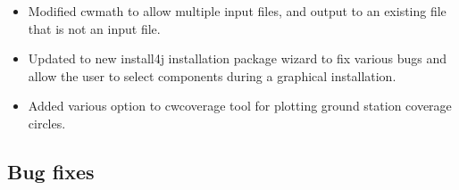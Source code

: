 \begin{itemize}
  \item Modified cwmath to allow multiple input files, and output to
  an existing file that is not an input file.

  \item Updated to new install4j installation package wizard to fix
  various bugs and allow the user to select components during a
  graphical installation.

  \item Added various option to cwcoverage tool for plotting ground
  station coverage circles.

\end{itemize}

\subsection*{Bug fixes}

